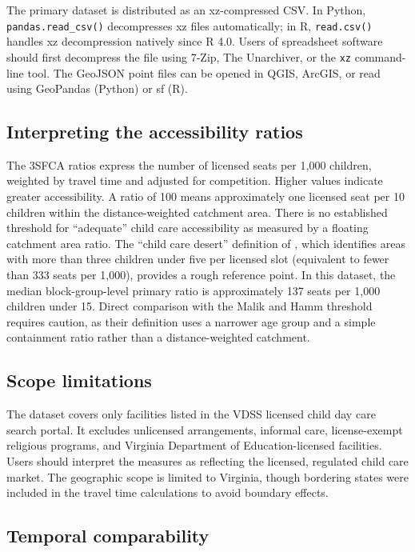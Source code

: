 \documentclass{CUP-JNL-DAP}%
\begin{document}
The primary dataset is distributed as an xz-compressed CSV. In Python, \texttt{pandas.read\_csv()} decompresses xz files automatically; in R, \texttt{read.csv()} handles xz decompression natively since R 4.0. Users of spreadsheet software should first decompress the file using 7-Zip, The Unarchiver, or the \texttt{xz} command-line tool. The GeoJSON point files can be opened in QGIS, ArcGIS, or read using GeoPandas (Python) or sf (R).

\subsection{Interpreting the accessibility ratios}

The 3SFCA ratios express the number of licensed seats per 1{,}000 children, weighted by travel time and adjusted for competition. Higher values indicate greater accessibility. A ratio of 100 means approximately one licensed seat per 10 children within the distance-weighted catchment area. There is no established threshold for ``adequate'' child care accessibility as measured by a floating catchment area ratio. The ``child care desert'' definition of \citet{malik2017}, which identifies areas with more than three children under five per licensed slot (equivalent to fewer than 333 seats per 1{,}000), provides a rough reference point. In this dataset, the median block-group-level primary ratio is approximately 137 seats per 1{,}000 children under 15. Direct comparison with the Malik and Hamm threshold requires caution, as their definition uses a narrower age group and a simple containment ratio rather than a distance-weighted catchment.

\subsection{Scope limitations}

The dataset covers only facilities listed in the VDSS licensed child day care search portal. It excludes unlicensed arrangements, informal care, license-exempt religious programs, and Virginia Department of Education-licensed facilities. Users should interpret the measures as reflecting the licensed, regulated child care market. The geographic scope is limited to Virginia, though bordering states were included in the travel time calculations to avoid boundary effects.

\subsection{Temporal comparability}
\end{document}
